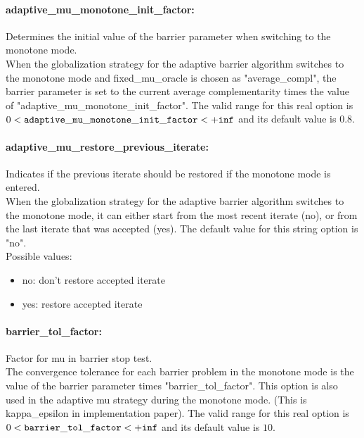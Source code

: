 \paragraph{adaptive\_mu\_monotone\_init\_factor:}\label{sec:adaptive_mu_monotone_init_factor} Determines the initial value of the barrier parameter when switching to the monotone mode. $\;$ \\
 When the globalization strategy for the adaptive
barrier algorithm switches to the monotone mode
and fixed\_mu\_oracle is chosen as
"average\_compl", the barrier parameter is set to
the current average complementarity times the
value of "adaptive\_mu\_monotone\_init\_factor". The valid range for this real option is 
$0 <  {\tt adaptive\_mu\_monotone\_init\_factor } <  {\tt +inf}$
and its default value is $0.8$.


\paragraph{adaptive\_mu\_restore\_previous\_iterate:}\label{sec:adaptive_mu_restore_previous_iterate} Indicates if the previous iterate should be restored if the monotone mode is entered. $\;$ \\
 When the globalization strategy for the adaptive
barrier algorithm switches to the monotone mode,
it can either start from the most recent iterate
(no), or from the last iterate that was accepted
(yes).
The default value for this string option is "no".
\\ 
Possible values:
\begin{itemize}
   \item no: don't restore accepted iterate
   \item yes: restore accepted iterate
\end{itemize}

\paragraph{barrier\_tol\_factor:}\label{sec:barrier_tol_factor} Factor for mu in barrier stop test. $\;$ \\
 The convergence tolerance for each barrier
problem in the monotone mode is the value of the
barrier parameter times "barrier\_tol\_factor".
This option is also used in the adaptive mu
strategy during the monotone mode. (This is
kappa\_epsilon in implementation paper). The valid range for this real option is 
$0 <  {\tt barrier\_tol\_factor } <  {\tt +inf}$
and its default value is $10$.


